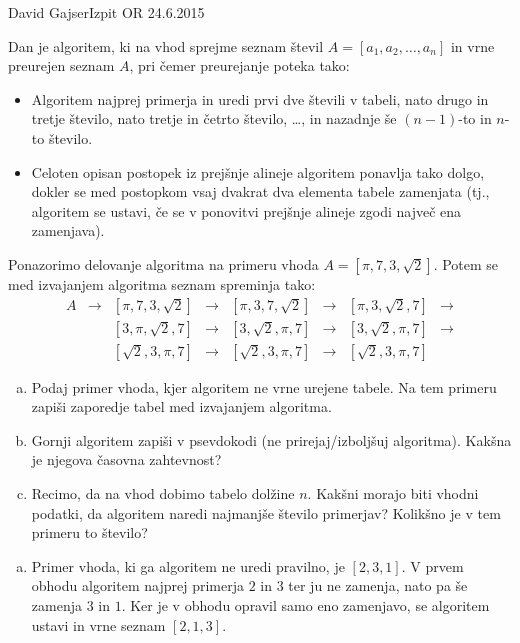 \begin{naloga}{David Gajser}{Izpit OR 24.6.2015}
\begin{vprasanje}
Dan je algoritem, ki na vhod sprejme seznam števil
$A = [a_1, a_2, \dots, a_n]$
in vrne preurejen seznam $A$,
pri čemer preurejanje poteka tako:
\begin{itemize}
\item Algoritem najprej primerja in uredi prvi dve števili v tabeli,
nato drugo in tretje število, nato tretje in četrto število, \dots,
in nazadnje še $(n-1)$-to in $n$-to število.
\item Celoten opisan postopek iz prejšnje alineje
algoritem ponavlja tako dolgo,
dokler se med postopkom vsaj dvakrat dva elementa tabele zamenjata
(tj., algoritem se ustavi,
če se v ponovitvi prejšnje alineje zgodi največ ena zamenjava).
\end{itemize}

Ponazorimo delovanje algoritma na primeru vhoda $A = [\pi, 7, 3, \sqrt{2}]$.
Potem se med izvajanjem algoritma seznam spreminja tako:
$$
\begin{array}{cccccccc}
A &\to& [\pi, 7, 3, \sqrt{2}]
  &\to& [\pi, 3, 7, \sqrt{2}]
  &\to& [\pi, 3, \sqrt{2}, 7] &\to \\
  &   & [3, \pi, \sqrt{2}, 7]
  &\to& [3, \sqrt{2}, \pi, 7]
  &\to& [3, \sqrt{2}, \pi, 7] &\to \\
  &   & [\sqrt{2}, 3, \pi, 7]
  &\to& [\sqrt{2}, 3, \pi, 7]
  &\to& [\sqrt{2}, 3, \pi, 7]
\end{array}
$$

\begin{enumerate}[(a)]
\item Podaj primer vhoda, kjer algoritem ne vrne urejene tabele.
Na tem primeru zapiši zaporedje tabel med izvajanjem algoritma.

\item Gornji algoritem zapiši v psevdokodi (ne prirejaj/izboljšuj algoritma).
Kakšna je njegova časovna zahtevnost?

\item Recimo, da na vhod dobimo tabelo dolžine $n$.
Kakšni morajo biti vhodni podatki,
da algoritem naredi najmanjše število primerjav?
Kolikšno je v tem primeru to število?
\end{enumerate}
\end{vprasanje}

\begin{odgovor}
\begin{enumerate}[(a)]
\item Primer vhoda, ki ga algoritem ne uredi pravilno, je $[2, 3, 1]$.
V prvem obhodu algoritem najprej primerja $2$ in $3$ ter ju ne zamenja,
nato pa še zamenja $3$ in $1$.
Ker je v obhodu opravil samo eno zamenjavo,
se algoritem ustavi in vrne seznam $[2, 1, 3]$.


\end{enumerate}
\end{odgovor}
\end{naloga}
